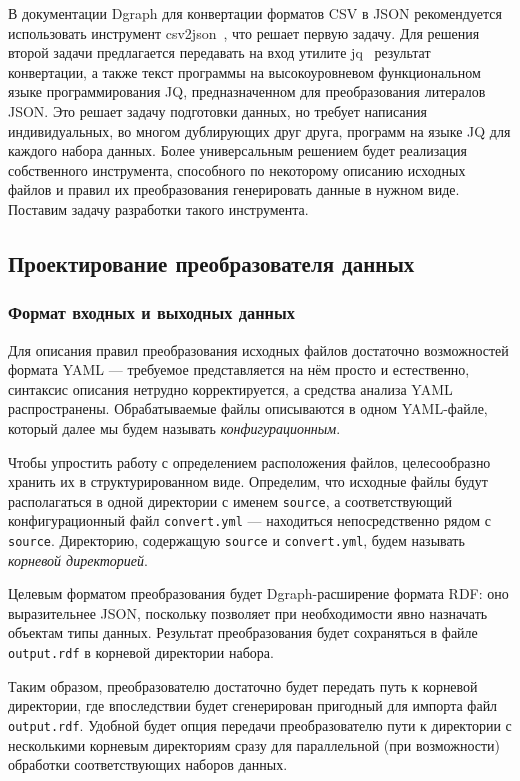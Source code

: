 В документации Dgraph для конвертации форматов CSV в JSON рекомендуется использовать инструмент
csv2json~\cite{csv2json}, что решает первую задачу. Для решения второй задачи предлагается передавать на вход утилите
jq~\cite{jq} результат конвертации, а также текст программы на высокоуровневом функциональном языке программирования JQ,
предназначенном для преобразования литералов JSON. Это решает задачу подготовки данных, но требует написания
индивидуальных, во многом дублирующих друг друга, программ на языке JQ для каждого набора данных. Более универсальным
решением будет реализация собственного инструмента, способного по некоторому описанию исходных файлов и правил их
преобразования генерировать данные в нужном виде. Поставим задачу разработки такого инструмента.

\subsection{Проектирование преобразователя данных}

\subsubsection{Формат входных и выходных данных}

Для описания правил преобразования исходных файлов достаточно возможностей формата YAML --- требуемое представляется на
нём просто и естественно, синтаксис описания нетрудно корректируется, а средства анализа YAML распространены.
Обрабатываемые файлы описываются в одном YAML-файле, который далее мы будем называть \textit{конфигурационным}.

Чтобы упростить работу с определением расположения файлов, целесообразно хранить их в структурированном виде. Определим,
что исходные файлы будут располагаться в одной директории с именем \texttt{source}, а соответствующий конфигурационный
файл \texttt{convert.yml} --- находиться непосредственно рядом с \texttt{source}. Директорию, содержащую \texttt{source}
и \texttt{convert.yml}, будем называть \textit{корневой директорией}.

Целевым форматом преобразования будет Dgraph-расширение формата RDF: оно выразительнее JSON, поскольку позволяет при
необходимости явно назначать объектам типы данных. Результат преобразования будет сохраняться в файле
\texttt{output.rdf} в корневой директории набора.

Таким образом, преобразователю достаточно будет передать путь к корневой директории, где впоследствии будет сгенерирован
пригодный для импорта файл \texttt{output.rdf}. Удобной будет опция передачи преобразователю пути к директории с
несколькими корневым директориям сразу для параллельной (при возможности) обработки соответствующих наборов данных.

